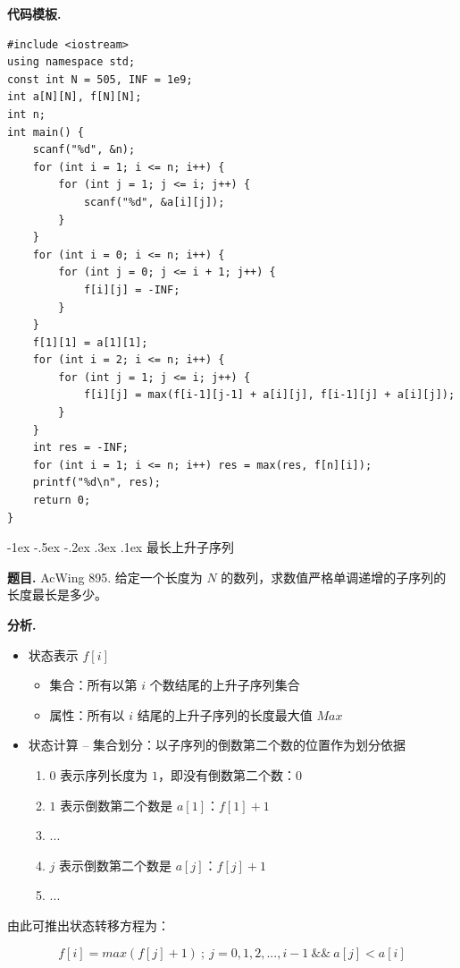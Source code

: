 \documentclass[12pt, a4paper, oneside]{ctexart}
\makeatletter
\newcommand{\xiaosihao}{\fontsize{12pt}{\baselineskip}\selectfont}
\renewcommand\subsubsection{\@startsection{subsubsection}{1}{\z@}%
{-1ex \@plus -.5ex \@minus -.2ex}%
{.3ex \@plus .1ex}%
{\normalfont\xiaosihao\kaishu}}
\newenvironment{problem}{\begin{shaded}\par\noindent\textbf{题目. }}{\end{shaded}\par}
\newenvironment{analysis}{\par\noindent\textbf{分析. }}{\par}
\newenvironment{template}{\par\noindent\textbf{代码模板. }}{\par}
\makeatother
\begin{document}
\begin{template}
\begin{lstlisting}
#include <iostream>
using namespace std;
const int N = 505, INF = 1e9;
int a[N][N], f[N][N];
int n;
int main() {
    scanf("%d", &n);
    for (int i = 1; i <= n; i++) {
        for (int j = 1; j <= i; j++) {
            scanf("%d", &a[i][j]);
        }
    }
    for (int i = 0; i <= n; i++) {
        for (int j = 0; j <= i + 1; j++) {
            f[i][j] = -INF;
        }
    }
    f[1][1] = a[1][1];
    for (int i = 2; i <= n; i++) {
        for (int j = 1; j <= i; j++) {
            f[i][j] = max(f[i-1][j-1] + a[i][j], f[i-1][j] + a[i][j]);
        }
    }
    int res = -INF;
    for (int i = 1; i <= n; i++) res = max(res, f[n][i]);
    printf("%d\n", res);
    return 0;
}
\end{lstlisting}
\end{template}


\subsubsection{最长上升子序列}

\begin{problem}
AcWing 895. 给定一个长度为 $N$ 的数列，求数值严格单调递增的子序列的长度最长是多少。
\end{problem}

\begin{analysis}
\begin{itemize}
\item 状态表示 $f[i]$
\begin{itemize}
\item 集合：所有以第 $i$ 个数结尾的上升子序列集合
\item 属性：所有以 $i$ 结尾的上升子序列的长度最大值 $Max$
\end{itemize}
\item 状态计算 -- 集合划分：以子序列的倒数第二个数的位置作为划分依据
\begin{enumerate}
\item $0$ 表示序列长度为 $1$，即没有倒数第二个数：$0$
\item $1$ 表示倒数第二个数是 $a[1]$：$f[1] + 1$
\item ...
\item $j$ 表示倒数第二个数是 $a[j]$：$f[j] + 1$
\item ...
\end{enumerate}
\end{itemize}

由此可推出状态转移方程为：

\[
f[i] = max(f[j] + 1)\ ;\ j = 0, 1, 2, ..., i-1 \ \&\& \ a[j] < a[i]
\]

\end{analysis}
\end{document}
